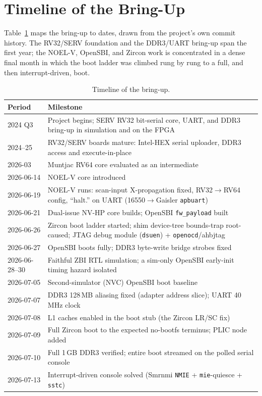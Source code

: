 \documentclass[conference,nofonttune]{IEEEtran}
\newcommand{\code}[1]{\texttt{#1}}
\newcommand{\reg}[1]{\texttt{#1}}
\begin{document}
\appendices

\section{Timeline of the Bring-Up}
\label{app:timeline}

Table~\ref{tab:timeline} maps the bring-up to dates, drawn from the project's own
commit history. The RV32/SERV foundation and the DDR3/UART bring-up span the
first year; the NOEL-V, OpenSBI, and Zircon work is concentrated in a dense final
month in which the boot ladder was climbed rung by rung to a full, and then
interrupt-driven, boot.

\begin{table}[ht]
\caption{Timeline of the bring-up.}
\label{tab:timeline}
\centering
\footnotesize
\begin{tabular}{@{}p{}p{}@{}}
\toprule
Period & Milestone \\
\midrule
2024 Q3 & Project begins; SERV RV32 bit-serial core, UART, and DDR3 bring-up in simulation and on the FPGA \\
2024--25 & RV32/SERV boards mature: Intel-HEX serial uploader, DDR3 access and execute-in-place \\
2026-03 & Muntjac RV64 core evaluated as an intermediate \\
2026-06-14 & NOEL-V core introduced \\
2026-06-19 & NOEL-V runs: scan-input X-propagation fixed, RV32$\rightarrow$RV64 config, ``halt.'' on UART (16550$\rightarrow$Gaisler \code{apbuart}) \\
2026-06-21 & Dual-issue NV-HP core builds; OpenSBI \code{fw\_payload} built \\
2026-06-26 & Zircon boot ladder started; shim device-tree bounds-trap root-caused; JTAG debug module (\code{dsuen}) + \code{openocd}/ahbjtag \\
2026-06-27 & OpenSBI boots fully; DDR3 byte-write bridge strobes fixed \\
2026-06-28--30 & Faithful ZBI RTL simulation; a sim-only OpenSBI early-init timing hazard isolated \\
2026-07-05 & Second-simulator (NVC) OpenSBI boot baseline \\
2026-07-07 & DDR3 128\,MB aliasing fixed (adapter address slice); UART 40\,MHz clock \\
2026-07-08 & L1 caches enabled in the boot stub (the Zircon LR/SC fix) \\
2026-07-09 & Full Zircon boot to the expected no-bootfs terminus; PLIC node added \\
2026-07-10 & Full 1\,GB DDR3 verified; entire boot streamed on the polled serial console \\
2026-07-13 & Interrupt-driven console solved (Smrnmi \reg{NMIE} + \reg{mie}-quiesce + \code{sstc}) \\
\bottomrule
\end{tabular}
\end{table}
\end{document}
